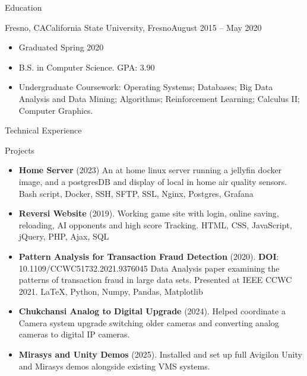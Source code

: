 \documentclass[]{mcdowellcvcustom}
\begin{document}
	
	\begin{cvsection}{Education}
		\begin{cvsubsection}{Fresno, CA}{California State University, Fresno}{August 2015 -- May 2020}
			\begin{itemize}
				\item Graduated Spring 2020 
				\item B.S. in Computer Science. GPA: 3.90
				\item Undergraduate Coursework: Operating Systems; Databases; Big Data Analysis and Data Mining; Algorithms; Reinforcement Learning; Calculus II; Computer Graphics.
			\end{itemize}
		\end{cvsubsection}
	\end{cvsection}
	
	\pagebreak
	
	\begin{cvsection}{Technical Experience}
		\begin{cvsubsection}{Projects}{}{}
			\begin{itemize}
				\item \textbf{Home Server} (2023) An at home linux server running a jellyfin docker image, and a postgresDB and display of local in home air quality sensors. Bash script, Docker, SSH, SFTP, SSL, Nginx, Postgres, Grafana
				\item \textbf{Reversi Website} (2019). Working game site with login, online saving, reloading, AI opponents and high score Tracking.  HTML, CSS, JavaScript, jQuery, PHP, Ajax, SQL
				\item \textbf{Pattern Analysis for Transaction Fraud Detection} (2020). \textbf{DOI}: 10.1109/CCWC51732.2021.9376045 Data Analysis paper examining the patterns of transaction fraud in large data sets. Presented at IEEE CCWC 2021. \LaTeX, Python, Numpy, Pandas, Matplotlib
				\item \textbf{Chukchansi Analog to Digital Upgrade} (2024). Helped coordinate a Camera system upgrade switching older cameras and converting analog cameras to digital IP cameras. 
				\item \textbf{Mirasys and Unity Demos} (2025). Installed and set up full Avigilon Unity and Mirasys demos alongside existing VMS systems.
				
			\end{itemize}
		\end{cvsubsection}
	\end{cvsection}
	
	\vspace{10mm}
\end{document}
